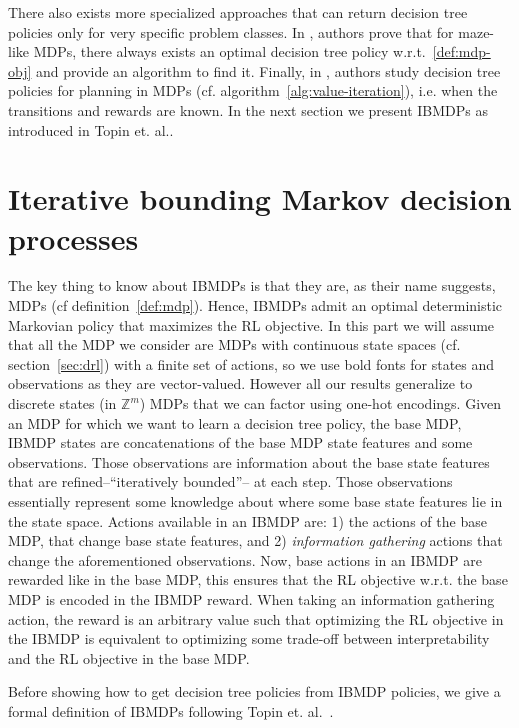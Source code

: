 There also exists more specialized approaches that can return decision tree policies only for very specific problem classes.
In \cite{theory1}, authors prove that for maze-like MDPs, there always exists an optimal decision tree policy w.r.t.~\ref{def:mdp-obj} and provide an algorithm to find it. 
Finally, in \cite{dt-opt-mdp}, authors study decision tree policies for planning in MDPs (cf. algorithm~\ref{alg:value-iteration}), i.e. when the transitions and rewards are known.
In the next section we present IBMDPs as introduced in Topin et. al.\cite{topin2021iterative}.

\section{Iterative bounding Markov decision processes}\label{sec:ibmdp}

The key thing to know about IBMDPs is that they are, as their name suggests, MDPs (cf definition~\ref{def:mdp}).
Hence, IBMDPs admit an optimal deterministic Markovian policy that maximizes the RL objective.
In this part we will assume that all the MDP we consider are MDPs with continuous state spaces (cf. section~\ref{sec:drl}) with a finite set of actions, so we use bold fonts for states and observations as they are vector-valued.
However all our results generalize to discrete states (in $\mathbb{Z}^m$) MDPs that we can factor using one-hot encodings. 
Given an MDP for which we want to learn a decision tree policy, the base MDP, IBMDP states are concatenations of the base MDP state features and some observations. 
Those observations are information about the base state features that are refined--``iteratively bounded''-- at each step.
Those observations essentially represent some knowledge about where some base state features lie in the state space.
Actions available in an IBMDP are: 1) the actions of the base MDP, that change base state features, and 2) \textit{information gathering} actions that change the aforementioned observations.
Now, base actions in an IBMDP are rewarded like in the base MDP, this ensures that the RL objective w.r.t. the base MDP is encoded in the IBMDP reward.
When taking an information gathering action, the reward is an arbitrary value such that optimizing the RL objective in the IBMDP is equivalent to optimizing some trade-off between interpretability and the RL objective in the base MDP.
 
Before showing how to get decision tree policies from IBMDP policies, we give a formal definition of IBMDPs following Topin et. al.~\cite{topin2021iterative}.


